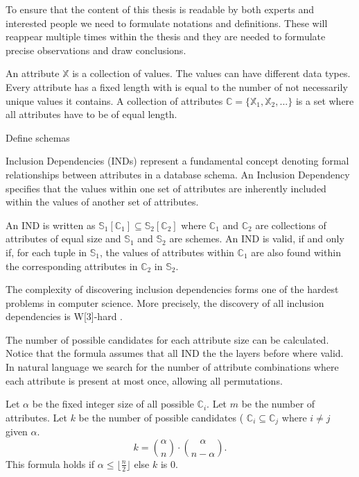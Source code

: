 To ensure that the content of this thesis is readable by both experts and interested people we need to formulate notations and definitions. These will reappear multiple times within the thesis and they are needed to formulate precise observations and draw conclusions.

\begin{definition}[Attributes]\label{def:attributes}
    An attribute $\mathbb{X}$ is a collection of values. The values can have different data types. Every attribute has a fixed length with is equal to the number of not necessarily unique values it contains. A collection of attributes $\mathbb{C} = \{\mathbb{X}_1, \mathbb{X}_2, ... \}$ is a set where all attributes have to be of equal length.
\end{definition}

\begin{definition}[Schemas]\label{def:schema}
    Define schemas
\end{definition}


Inclusion Dependencies (INDs) represent a fundamental concept denoting formal relationships between attributes in a database schema. An Inclusion Dependency specifies that the values within one set of attributes are inherently included within the values of another set of attributes.

\begin{definition}\label{def:inds}
    An IND is written as $\mathbb{S}_1[\mathbb{C}_1] \subseteq \mathbb{S}_2[\mathbb{C}_2]$ where $\mathbb{C}_1$ and $\mathbb{C}_2$ are collections of attributes of equal size and $\mathbb{S}_1$ and $\mathbb{S}_2$ are schemes. An IND is valid, if and only if, for each tuple in $\mathbb{S}_1$, the values of attributes within $\mathbb{C}_1$ are also found within the corresponding attributes in $\mathbb{C}_2$ in $\mathbb{S}_2$.
\end{definition}

The complexity of discovering inclusion dependencies forms one of the hardest problems in computer science. More precisely, the discovery of all inclusion dependencies is W[3]-hard \cite{blasius2017parameterized}. %

The number of possible candidates for each attribute size can be calculated. Notice that the formula assumes that all IND the the layers before where valid. In natural language we search for the number of attribute combinations where each attribute is present at most once, allowing all permutations.
\begin{definition}\label{def:candidates}
    Let $\alpha$ be the fixed integer size of all possible $\mathbb{C}_i$. Let $m$ be the number of attributes. Let $k$ be the number of possible candidates ( $\mathbb{C}_i \subseteq \mathbb{C}_j$ where $i \not = j$ given $\alpha$.
    $$
        k = \binom{\alpha}{n} \cdot \binom{\alpha}{n-\alpha}.
    $$
    This formula holds if $\alpha \leq \lfloor \frac{n}{2} \rfloor$ else $k$ is $0$.
\end{definition}


